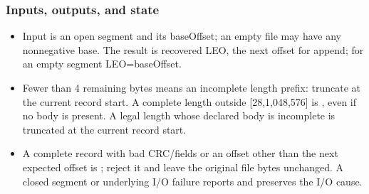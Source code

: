 \subsubsection*{Inputs, outputs, and state}
\begin{itemize}
\item Input is an open segment and its baseOffset; an empty file may have any nonnegative base. The result is recovered LEO, the next offset for append; for an empty segment LEO=baseOffset.
\item Fewer than 4 remaining bytes means an incomplete length prefix: truncate at the current record start. A complete length outside [28,1,048,576] is , even if no body is present. A legal length whose declared body is incomplete is truncated at the current record start.
\item A complete record with bad CRC/fields or an offset other than the next expected offset is ; reject it and leave the original file bytes unchanged. A closed segment or underlying I/O failure reports  and preserves the I/O cause.
\end{itemize}
